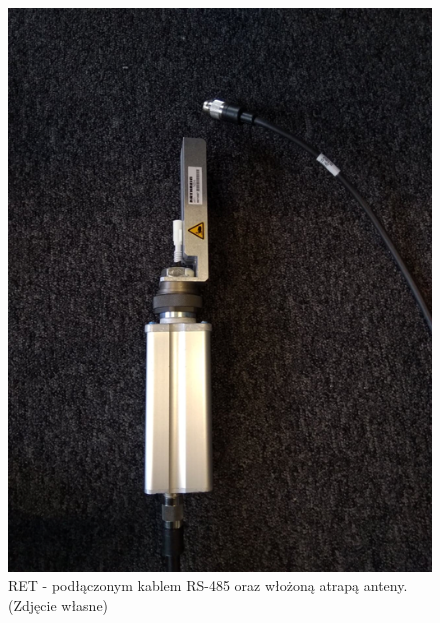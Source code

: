 		\begin{figure}[h!]
			\centering
			\includegraphics[scale=0.4]{Obrazki/RET_2.png}
			\caption{RET - podłączonym kablem RS-485 oraz włożoną atrapą anteny.
				\newline(Zdjęcie własne)}
			\label{fig:Obrazek_RET2}
		\end{figure}

